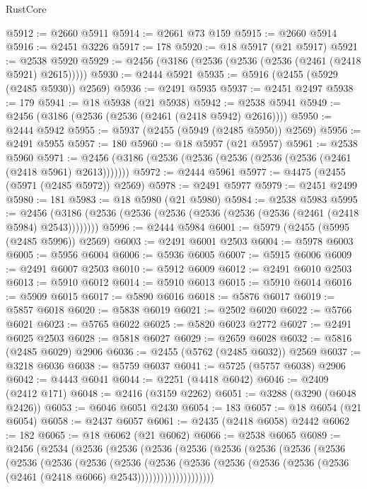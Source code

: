\begin{lexlean}{RustCore}
\begin{coremodule}
@5912 := @2660 @5911
@5914 := @2661 @73 @159
@5915 := @2660 @5914
@5916 := @2451 @3226
@5917 := 178
@5920 := @18 @5917 (@21 @5917)
@5921 := @2538 @5920
@5929 := @2456 (@3186 (@2536 (@2536 (@2536 (@2461 (@2418 @5921) @2615)))))
@5930 := @2444 @5921
@5935 := @5916 (@2455 (@5929 (@2485 @5930)) @2569)
@5936 := @2491 @5935
@5937 := @2451 @2497
@5938 := 179
@5941 := @18 @5938 (@21 @5938)
@5942 := @2538 @5941
@5949 := @2456 (@3186 (@2536 (@2536 (@2461 (@2418 @5942) @2616))))
@5950 := @2444 @5942
@5955 := @5937 (@2455 (@5949 (@2485 @5950)) @2569)
@5956 := @2491 @5955
@5957 := 180
@5960 := @18 @5957 (@21 @5957)
@5961 := @2538 @5960
@5971 := @2456 (@3186 (@2536 (@2536 (@2536 (@2536 (@2536 (@2461 (@2418 @5961) @2613)))))))
@5972 := @2444 @5961
@5977 := @4475 (@2455 (@5971 (@2485 @5972)) @2569)
@5978 := @2491 @5977
@5979 := @2451 @2499
@5980 := 181
@5983 := @18 @5980 (@21 @5980)
@5984 := @2538 @5983
@5995 := @2456 (@3186 (@2536 (@2536 (@2536 (@2536 (@2536 (@2536 (@2461 (@2418 @5984) @2543))))))))
@5996 := @2444 @5984
@6001 := @5979 (@2455 (@5995 (@2485 @5996)) @2569)
@6003 := @2491 @6001 @2503
@6004 := @5978 @6003
@6005 := @5956 @6004
@6006 := @5936 @6005
@6007 := @5915 @6006
@6009 := @2491 @6007 @2503
@6010 := @5912 @6009
@6012 := @2491 @6010 @2503
@6013 := @5910 @6012
@6014 := @5910 @6013
@6015 := @5910 @6014
@6016 := @5909 @6015
@6017 := @5890 @6016
@6018 := @5876 @6017
@6019 := @5857 @6018
@6020 := @5838 @6019
@6021 := @2502 @6020
@6022 := @5766 @6021
@6023 := @5765 @6022
@6025 := @5820 @6023 @2772
@6027 := @2491 @6025 @2503
@6028 := @5818 @6027
@6029 := @2659 @6028
@6032 := @5816 (@2485 @6029) @2906
@6036 := @2455 (@5762 (@2485 @6032)) @2569
@6037 := @3218 @6036
@6038 := @5759 @6037
@6041 := @5725 (@5757 @6038) @2906
@6042 := @4443 @6041
@6044 := @2251 (@4418 @6042)
@6046 := @2409 (@2412 @171)
@6048 := @2416 (@3159 @2262)
@6051 := @3288 (@3290 (@6048 @2426))
@6053 := @6046 @6051 @2430
@6054 := 183
@6057 := @18 @6054 (@21 @6054)
@6058 := @2437 @6057
@6061 := @2435 (@2418 @6058) @2442
@6062 := 182
@6065 := @18 @6062 (@21 @6062)
@6066 := @2538 @6065
@6089 := @2456
    (@2534
      (@2536
        (@2536
          (@2536
            (@2536
              (@2536
                (@2536
                  (@2536
                    (@2536
                      (@2536
                        (@2536
                          (@2536
                            (@2536
                              (@2536
                                (@2536
                                  (@2536
                                    (@2536
                                      (@2536 (@2536 (@2461 (@2418 @6066) @2543))))))))))))))))))))

\end{coremodule}
\end{lexlean}
